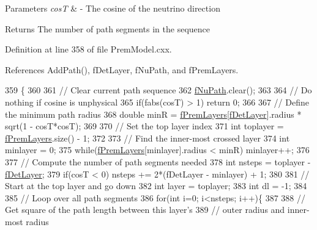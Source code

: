 \begin{DoxyParams}{Parameters}
{\em cosT} & -\/ The cosine of the neutrino direction \\
\hline
\end{DoxyParams}
\begin{DoxyReturn}{Returns}
The number of path segments in the sequence 
\end{DoxyReturn}


Definition at line 358 of file Prem\+Model.\+cxx.



References Add\+Path(), f\+Det\+Layer, f\+Nu\+Path, and f\+Prem\+Layers.


\begin{DoxyCode}
359 \{
360 
361   \textcolor{comment}{// Clear current path sequence}
362   \hyperlink{classOscProb_1_1PremModel_aaf3c77e35798d664853157013c90ad2b}{fNuPath}.clear();
363 
364   \textcolor{comment}{// Do nothing if cosine is unphysical}
365   \textcolor{keywordflow}{if}(fabs(cosT) > 1) \textcolor{keywordflow}{return} 0;
366 
367   \textcolor{comment}{// Define the minimum path radius}
368   \textcolor{keywordtype}{double} minR = \hyperlink{classOscProb_1_1PremModel_a19a9a3b23ec154ad7a29f92b74aa5bc6}{fPremLayers}[\hyperlink{classOscProb_1_1PremModel_a4fb68506493666349f418b893a996185}{fDetLayer}].radius * sqrt(1 - cosT*cosT);
369 
370   \textcolor{comment}{// Set the top layer index}
371   \textcolor{keywordtype}{int} toplayer = \hyperlink{classOscProb_1_1PremModel_a19a9a3b23ec154ad7a29f92b74aa5bc6}{fPremLayers}.size() - 1;
372 
373   \textcolor{comment}{// Find the inner-most crossed layer}
374   \textcolor{keywordtype}{int} minlayer = 0;
375   \textcolor{keywordflow}{while}(\hyperlink{classOscProb_1_1PremModel_a19a9a3b23ec154ad7a29f92b74aa5bc6}{fPremLayers}[minlayer].radius < minR) minlayer++;
376 
377   \textcolor{comment}{// Compute the number of path segments needed}
378   \textcolor{keywordtype}{int} nsteps = toplayer - \hyperlink{classOscProb_1_1PremModel_a4fb68506493666349f418b893a996185}{fDetLayer};
379   \textcolor{keywordflow}{if}(cosT < 0) nsteps += 2*(fDetLayer - minlayer) + 1;
380 
381   \textcolor{comment}{// Start at the top layer and go down}
382   \textcolor{keywordtype}{int} layer = toplayer;
383   \textcolor{keywordtype}{int} dl = -1;
384 
385   \textcolor{comment}{// Loop over all path segments}
386   \textcolor{keywordflow}{for}(\textcolor{keywordtype}{int} i=0; i<nsteps; i++)\{
387 
388     \textcolor{comment}{// Get square of the path length between this layer's}
389     \textcolor{comment}{// outer radius and  inner-most radius}

\end{DoxyCode}
